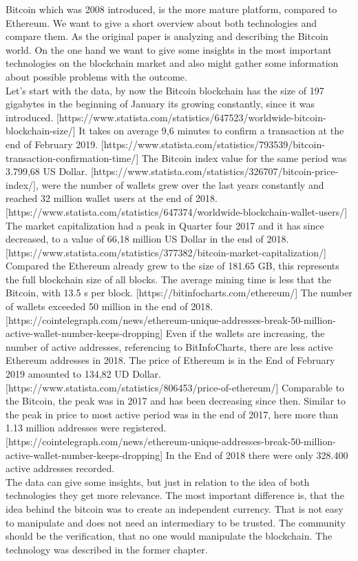Bitcoin which was 2008 introduced, is the more mature platform, compared to Ethereum. We want to give a short overview about both technologies and compare them. As the original paper is analyzing and describing the Bitcoin world. On the one hand we want to give some insights in the most important technologies on the blockchain market and also might gather some information about possible problems with the outcome. 
\\
Let’s start with the data, by now the Bitcoin blockchain has the size of 197 gigabytes in the beginning of January its growing constantly, since it was introduced. [https://www.statista.com/statistics/647523/worldwide-bitcoin-blockchain-size/]
It takes on average 9,6 minutes to confirm a transaction at the end of February 2019. [https://www.statista.com/statistics/793539/bitcoin-transaction-confirmation-time/] The Bitcoin index value for the same period was 3.799,68 US Dollar. [https://www.statista.com/statistics/326707/bitcoin-price-index/], were the number of wallets grew over the last years constantly and reached 32 million wallet users at the end of 2018. [https://www.statista.com/statistics/647374/worldwide-blockchain-wallet-users/] The market capitalization had a peak in Quarter four 2017 and it has since decreased, to a value of 66,18 million US Dollar in the end of 2018. [https://www.statista.com/statistics/377382/bitcoin-market-capitalization/]
Compared the Ethereum already grew to the size of 181.65 GB, this represents the full blockchain size of all blocks. The average mining time is less that the Bitcoin, with 13.5 s per block. [https://bitinfocharts.com/ethereum/] The number of wallets exceeded 50 million in the end of 2018. [https://cointelegraph.com/news/ethereum-unique-addresses-break-50-million-active-wallet-number-keeps-dropping] Even if the wallets are increasing, the number of active addresses, referencing to BitInfoCharts, there are less active Ethereum addresses in 2018. 
The price of Ethereum is in the End of February 2019 amounted to 134,82 UD Dollar. [https://www.statista.com/statistics/806453/price-of-ethereum/] Comparable to the Bitcoin, the peak was in 2017 and has been decreasing since then. Similar to the peak in price to most active period was in the end of 2017, here more than 1.13 million addresses were registered. [https://cointelegraph.com/news/ethereum-unique-addresses-break-50-million-active-wallet-number-keeps-dropping] In the End of 2018 there were only 328.400 active addresses recorded. 
\\
The data can give some insights, but just in relation to the idea of both technologies they get more relevance. The most important difference is, that the idea behind the bitcoin was to create an independent currency. That is not easy to manipulate and does not need an intermediary to be trusted. The community should be the verification, that no one would manipulate the blockchain. The technology was described in the former chapter. 
